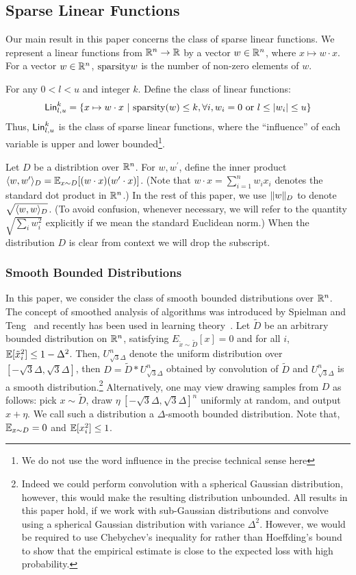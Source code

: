 \subsection{Sparse Linear Functions} 

Our main result in this paper concerns the class of sparse linear functions.  We
represent a linear functions from $\mathbb{R}^n \rightarrow \mathbb{R}$ by a vector $w
\in \mathbb{R}^n$, where $x \mapsto w \cdot x$.  For a vector $w \in \mathbb{R}^n$,
$\mathrm{sparsity}{w}$ is the number of non-zero elements of $w$. 

For any $0 < l < u$ and integer $k$. Define the class of linear functions:
\[
\mathsf{Lin}^k_{l, u} = \{ x \mapsto w \cdot x ~|~ \mathrm{sparsity}(w) \leq k, \forall i,
w_i = 0 \mbox{ or } l \leq |w_i| \leq u \}
\]
Thus, $\mathsf{Lin}^k_{l, u}$ is the class of sparse linear functions, where the
``influence'' of each variable is upper and lower bounded\footnote{We do not use
the word influence in the precise technical sense here}.

Let $D$ be a distribtion over $\mathbb{R}^n$. For $w, w^\prime$, define the inner
product $\langle w, w^\prime \rangle_D = \mathbb{E}_{x \sim D}[(w \cdot x) (w^\prime \cdot x)]$.
(Note that $w \cdot x = \sum_{i = 1}^n w_i x_i$ denotes the standard dot product
in $\mathbb{R}^n$.) In the rest of this paper, we use $\Vert w \Vert_D$ to denote
$\sqrt{\langle w, w \rangle_D}$. (To avoid confusion, whenever necessary, we
will refer to the quantity $\sqrt{\sum_{i} w_i^2}$ explicitly if we mean the standard
Euclidean norm.) When the distribution $D$ is clear from context we will drop
the subscript.

\subsubsection*{Smooth Bounded Distributions}

In this paper, we consider the class of smooth bounded distributions over
$\mathbb{R}^n$. The concept of smoothed analysis of algorithms was introduced by
Spielman and Teng~\cite{ST:2001} and recently has been used in learning
theory~\cite{KST:2009,KKM:2013}.  Let $\tilde{D}$ be an arbitrary bounded
distribution on $\mathbb{R}^n$, satisfying $E_{\tilde{x} \sim \tilde{D}}[x]=0$ and
for all $i$, $\mathbb{E}[\tilde{x}_i^2] \leq 1 - \Delta^2$.  Then,
$U^n_{\sqrt{3}\Delta}$ denote the uniform distribution over $[-\sqrt{3} \Delta,
\sqrt{3}\Delta]$, then $D = \tilde{D}* U^n_{\sqrt{3} \Delta}$ obtained by
convolution of $\tilde{D}$ and $U^n_{\sqrt{3}\Delta}$ is a smooth
distribution.\footnote{Indeed we could perform convolution with a spherical
Gaussian distribution, however, this would make the resulting distribution
unbounded. All results in this paper hold, if we work with sub-Gaussian
distributions and convolve using a spherical Gaussian distribution with variance
$\Delta^2$. However, we would be required to use Chebychev's inequality for
rather than Hoeffding's bound to show that the empirical estimate is close to
the expected loss with high probability.} Alternatively, one may view drawing
samples from $D$ as follows: pick $x \sim \tilde{D}$, draw $\eta ~ [-\sqrt{3}
\Delta, \sqrt{3} \Delta]^n$ uniformly at random, and output $x + \eta$. We call
such a distribution a $\Delta$-smooth bounded distribution. Note that, $\mathbb{E}_{x
\sim D} = 0$ and $\mathbb{E}[x_i^2] \leq 1$.

